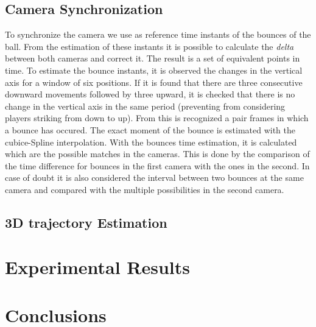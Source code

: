 \documentclass[a4paper]{article}
\begin{document}
\subsection{Camera Synchronization}
To synchronize the camera we use as reference time instants of the bounces of the ball. From the estimation of these instants it is possible to calculate the \textit{delta} between both cameras and correct it. The result is a set of equivalent points in time.
To estimate the bounce instants, it is observed the changes in the vertical axis for a window of six positions. If it is found that there are three consecutive downward movements followed by three upward, it is checked that there is no change in the vertical axis in the same period (preventing from considering players striking from down to up). From this is recognized a pair frames in which a bounce has occured. The exact moment of the bounce is estimated with the cubice-Spline interpolation.
With the bounces time estimation, it is calculated which are the possible matches in the cameras. This is done by the comparison of the time difference for bounces in the first camera with the ones in the second. In case of doubt it is also considered the interval between two bounces at the same camera and compared with the multiple possibilities in the second camera.

\subsection{3D trajectory Estimation}


\section{Experimental Results}
\section{Conclusions}
\end{document}
